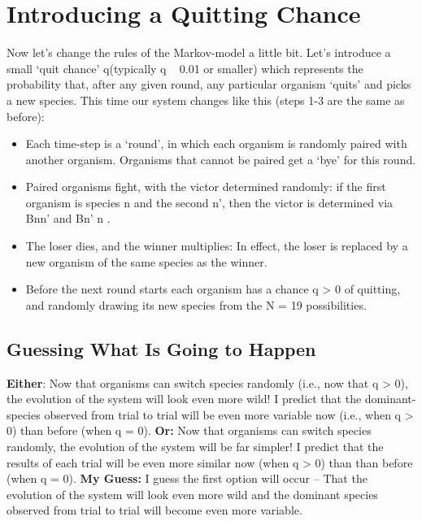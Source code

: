 \documentclass[border=1pt]{article}
\begin{document}
\section{Introducing a Quitting Chance}
Now let’s change the rules of the Markov-model a little bit. Let’s introduce a small ‘quit chance’ q(typically q ~ 0.01 or smaller) which represents the probability that, after any given round, any particular organism ‘quits’ and picks a new species. This time our system changes like this (steps 1-3 are the same as before):

\begin{itemize}
\item Each time-step is a ‘round’, in which each organism is randomly paired with another organism. Organisms that cannot be paired get a ‘bye’ for this round.
\item Paired organisms fight, with the victor determined randomly: if the first organism is species n and the second n’, then the victor is determined via Bnn' and Bn' n .
\item The loser dies, and the winner multiplies: In effect, the loser is replaced by a new organism of the same species as the winner. 
\item Before the next round starts each organism has a chance q > 0 of quitting, and randomly drawing its new species from the N = 19 possibilities.
\end{itemize}

\subsection{Guessing What Is Going to Happen}
\textbf{Either}: Now that organisms can switch species randomly (i.e., now that q > 0), the evolution of the system will look even more wild! I predict that the dominant-species observed from trial to trial will be even more variable now (i.e., when q > 0) than before (when q = 0).
\textbf{Or:} Now that organisms can switch species randomly, the evolution of the system will be far simpler! I predict that the results of each trial will be even more similar now (when q > 0) than than before (when q = 0).
\textbf{My Guess:} I guess the first option will occur – That the evolution of the system will look even more wild and the dominant species observed from trial to trial will become even more variable.
\end{document}
